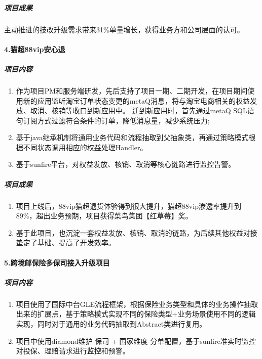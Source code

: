 \subparagraph{项目成果}\label{ux9879ux76eeux6210ux679c-5}

主动推进的技改升级需求带来31\%单量增长，获得业务方和公司层面的认可。

\paragraph{4.猫超88vip安心退}\label{ux732bux8d8588vipux5b89ux5fc3ux9000}

\subparagraph{项目内容}\label{ux9879ux76eeux5185ux5bb9-6}

\begin{enumerate}
\def\labelenumi{\arabic{enumi}.}
\tightlist
\item
  作为项目PM和服务端研发，先后支持了项目一期、二期开发，在项目期间使用新的应用监听淘宝订单状态变更的metaQ消息，将与淘宝电商相关的权益发放、取消、核销等收口到新应用中。
  迁到新应用时，首先通过metaQ
  SQL语句订阅方式过滤符合条件的订单，降低消息量，减少系统压力;
\item
  基于java继承机制将通用业务代码和流程抽取到父抽象类，再通过策略模式根据不同状态调用相应的权益处理Handler。
\item
  基于sunfire平台，对权益发放、核销、取消等核心链路进行监控告警。
\end{enumerate}

\subparagraph{项目成果}\label{ux9879ux76eeux6210ux679c-6}

\begin{enumerate}
\def\labelenumi{\arabic{enumi}.}
\tightlist
\item
  项目上线后，88vip猫超退货体验得到很大提升，猫超88vip渗透率提升到89\%，超出业务预期，项目获得菜鸟集团【红草莓】奖。
\item
  基于此项目，也沉淀一套权益发放、核销、取消的链路，为后续其他权益对接垫定了基础、提高了开发效率。
\end{enumerate}

\paragraph{5.跨境邮保险多保司接入升级项目}\label{ux8de8ux5883ux90aeux4fddux9669ux591aux4fddux53f8ux63a5ux5165ux5347ux7ea7ux9879ux76ee}

\subparagraph{项目内容}\label{ux9879ux76eeux5185ux5bb9-7}

\begin{enumerate}
\def\labelenumi{\arabic{enumi}.}
\tightlist
\item
  项目使用了国际中台GLE流程框架，根据保险业务类型和具体的业务操作抽取出来的扩展点，基于策略模式实现不同的保险类型+业务场景使用不同的逻辑实现，同时对于通用的业务代码抽取到Abstract类进行复用。
\item
  项目中使用diamond维护 保司 + 国家维度
  分单配置，基于sunfire准实时监控对投保、理赔请求进行监控和预警。
\end{enumerate}

